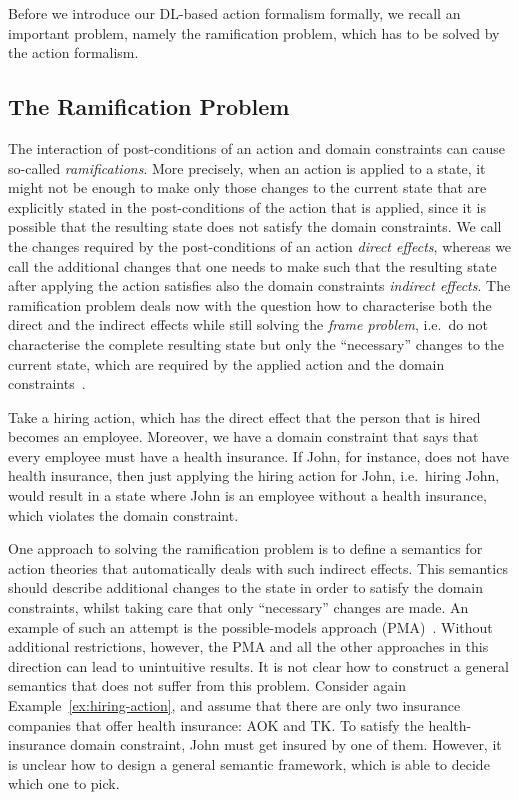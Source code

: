 Before we introduce our DL-based action formalism formally, we recall an
important problem, namely the ramification problem, which has to be solved by
the action formalism.


\subsection{The Ramification Problem}\label{sec:ramification-problem}

The interaction of post-conditions of an action and domain constraints can cause
so-called \emph{ramifications}.  More precisely, when an action is applied to a
state, it might not be enough to make only those changes to the current state
that are explicitly stated in the post-conditions of the action that is applied,
since it is possible that the resulting state does not satisfy the domain
constraints.  We call the changes required by the post-conditions of an action
\emph{direct effects}, whereas we call the additional changes that one needs to
make such that the resulting state after applying the action satisfies also the
domain constraints \emph{indirect effects}.  The ramification problem deals now
with the question how to characterise both the direct and the indirect effects
while still solving the \emph{frame problem}, i.e.~do not characterise the
complete resulting state but only the \enquote{necessary} changes to the current
state, which are required by the applied action and the domain
constraints~\cite{McCH-MI69,Rei-01}.

\begin{example}\label{ex:hiring-action}
    Take a hiring action, which has the direct effect that the person that is
    hired becomes an employee.  Moreover, we have a domain constraint that says
    that every employee must have a health insurance.  If John, for instance,
    does not have health insurance, then just applying the hiring action for
    John, i.e.~hiring John, would result in a state where John is an employee
    without a health insurance, which violates the domain constraint.
\end{example}

\noindent
One approach to solving the ramification problem is to define a semantics for
action theories that automatically deals with such indirect effects.  This
semantics should describe additional changes to the state in order to satisfy
the domain constraints, whilst taking care that only \enquote{necessary} changes
are made.  An example of such an attempt is the possible-models approach
(PMA)~\cite{Win-AAAI88,Her-KR96}.  Without additional restrictions, however, the
PMA and all the other approaches in this direction can lead to unintuitive
results.  It is not clear how to construct a general semantics that does not
suffer from this problem.
%
Consider again Example~\ref{ex:hiring-action}, and assume that there are only
two insurance companies that offer health insurance: AOK and TK\@.  To satisfy
the health-insurance domain constraint, John must get insured by one of them.
However, it is unclear how to design a general semantic framework, which is able
to decide which one to pick.

